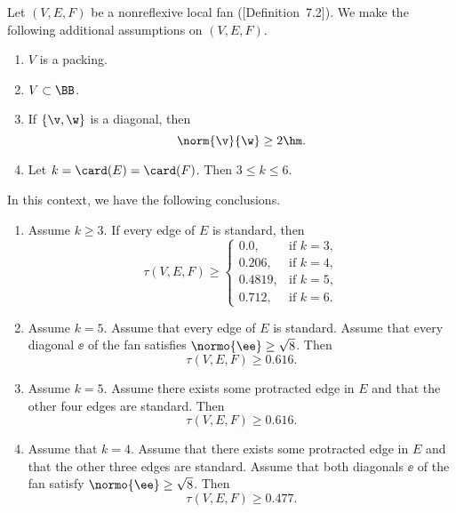 \begin{theorem}\label{lemma:main-estimate}
Let $(V,E,F)$ be a nonreflexive local fan (\cite{DSP}[Definition~7.2]). 
We make the following additional
assumptions on $(V,E,F)$.
\begin{enumerate}
\item {} $V$ is a packing.  
\item {} $V\subset \BB$.
\item {} If $\{\v,\w\}$ is a diagonal,  then 
\[ 
\norm{\v}{\w}\ge 2\hm.
\] 
\item {} 
Let   $k=\card(E)=\card(F)$.  Then $3\le k \le 6$.
\end{enumerate}
In this context, we have the following conclusions.
\begin{enumerate}
\item Assume $k\ge 3$.  If  every edge of $E$ is standard, then
\[ 
\tau(V,E,F) \ge
\begin{cases}
  0.0,&\text{if }k=3,\\
  0.206,&\text{if }k=4,\\
  0.4819,&\text{if }k=5,\\
  0.712,&\text{if }k=6.
\end{cases}
\] 
\item Assume $k=5$.  Assume that every edge of $E$ is standard.
Assume that every diagonal $\ee$ of the fan satisfies $\normo{\ee}\ge\sqrt{8}$.
Then 
\begin{equation}
\tau(V,E,F)\ge 0.616. \tag{check:pent\_diag\_cs}
\end{equation}
\item Assume $k=5$.  Assume there exists some protracted edge in $E$ 
and that the other four edges are standard.  Then 
\begin{equation}
\tau(V,E,F)\ge 0.616. \tag{check:pent\_pro\_cs}
\end{equation}
\item Assume that $k=4$.  Assume that there exists some protracted
 edge in $E$ and that the other three edges are standard.  
Assume that both diagonals $\ee$ of the fan satisfy $\normo{\ee}\ge\sqrt{8}$.
Then
\begin{equation}
\tau(V,E,F)\ge 0.477. \tag{check:quad\_pro\_cs}

\end{equation}
\end{enumerate}
\end{theorem}
